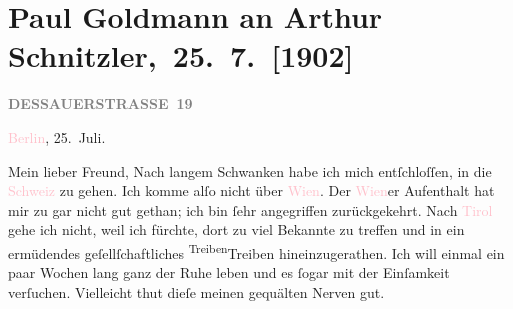 

\renewcommand{\erwaehntePersonen}{Personen: Otto Brahm, Raphael Löwenfeld, Walther Rathenau, Olga Schnitzler, Elisabeth Steinrück}
\renewcommand{\erwaehnteInstitutionen}{Institutionen: S. Hirzel Verlag (Leipzig), Schiller-Theater}
\renewcommand{\erwaehnteOrte}{Orte: Berlin, Dessauer Straße, Kaltenleutgeben, Leipzig, Schweiz, Südtirol, Tirol, Wien}
\renewcommand{\erwaehnteWerke}{Werke: Der Schleier der Beatrice. Schauspiel in fünf Akten, Impressionen}
\section[ Paul Goldmann an Arthur Schnitzler, 25. 7. {[}1902{]}]{Paul Goldmann an Arthur Schnitzler, 25. 7. {[}1902{]}}
\nopagebreak{}
\rehead{ }\normalsize\beginnumbering{}
\toendnotes[C]{\smallbreak\pagebreak[2]}
\toendnotes[C]{\smallbreak}
\pstart
           \noindent{}\raggedleft{}{\pb}\textcolor{pink}{\textcolor{gray}{\textbf{DESSAUERSTRASSE 19}}}{}\ledrightnote{\textcolor{pink}{Dessauer Straße}}\pend
           
\pstart
           \textcolor{pink}{Berlin}{}\ledrightnote{\textcolor{pink}{Berlin}}, 25. Juli.\pend
           
\pstart\center{}Mein lieber Freund,\pend
\pstart
           Nach langem Schwanken habe ich mich entſchloſſen, in die \textcolor{pink}{Schweiz}{}\ledrightnote{\textcolor{pink}{Schweiz}} zu gehen. Ich komme alſo nicht über \textcolor{pink}{Wien}{}\ledrightnote{\textcolor{pink}{Wien}}. Der \textcolor{pink}{Wien}{}\ledrightnote{\textcolor{pink}{Wien}}er Aufenthalt
               hat mir zu \label{K_L03214-1v}\label{K_L03214-1h} gar nicht gut gethan; ich  bin ſehr
               angegriffen zurückgekehrt. Nach \textcolor{pink}{Tirol}{}\ledrightnote{\textcolor{pink}{Tirol}{\newline}\textcolor{pink}{Südtirol}} gehe ich
               nicht, weil ich fürchte, dort zu viel Bekannte zu treffen und in ein ermüdendes
               geſellſchaftliches {\pb}\substVorne{}\textsuperscript{Treiben}{\allowbreak}\substDazwischen{}Treiben\substHinten{} hineinzugerathen. Ich will einmal ein paar Wochen lang ganz der Ruhe leben
               und es ſogar mit der Einſamkeit verſuchen. Vielleicht thut dieſe meinen gequälten
               Nerven gut.\pend
           
